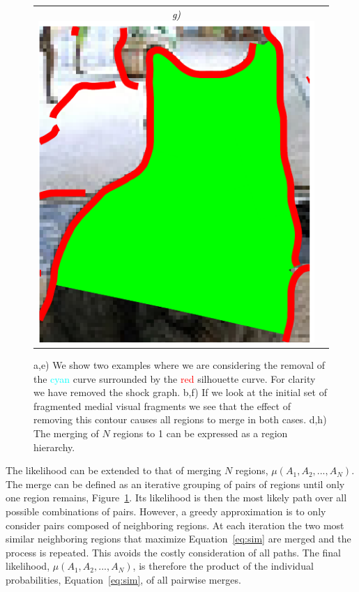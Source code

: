 \begin{appendices}
\begin{figure}[!ht]
\begin{tabular}{cc}
{\footnotesize\textit{\textcolor{black}{g)}}}\includegraphics[height=0.09\textwidth]{figs/cat3.pdf}\\
\end{tabular}
\caption{a,e) We show two examples where we are considering the removal of the \textcolor{cyan}{cyan} curve surrounded by the \textcolor{red}{red} silhouette curve. For clarity we have removed the shock graph. b,f) If we look at the initial set of fragmented medial visual fragments we see that the effect of removing this contour causes all regions to merge in both cases. d,h) The merging of $N$ regions to 1 can be expressed as a region hierarchy.}
\label{fig:loop_cost2}
\end{figure}

The likelihood can be extended to that of merging $N$ regions, $\mu(A_1,A_2,...,A_N)$. The merge can be defined as an iterative grouping of pairs of regions until only one region remains, Figure~\ref{fig:loop_cost2}. Its likelihood is then the most likely path over all possible combinations of pairs. However, a greedy approximation is to only consider pairs composed of neighboring regions. At each iteration the two most similar neighboring regions that maximize Equation~\ref{eq:sim} are merged and the process is repeated. This avoids the costly consideration of all paths. The final likelihood, $\mu(A_1,A_2,...,A_N)$,  is therefore the product of the individual probabilities, Equation~\ref{eq:sim}, of all pairwise merges. 





\end{appendices}
